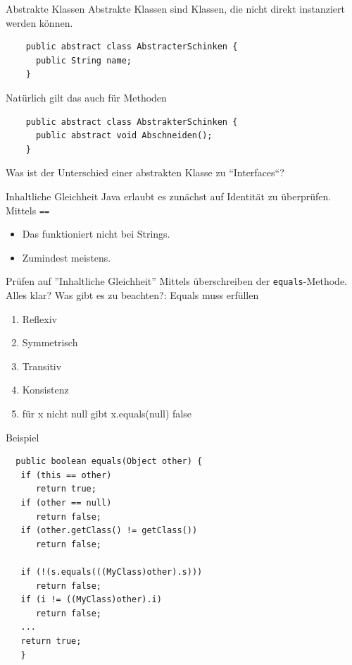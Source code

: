 \documentclass[18pt]{beamer}
\begin{document}
\begin{frame}[fragile]{Abstrakte Klassen}
 Abstrakte Klassen sind Klassen, die nicht direkt instanziert werden können.
 \begin{lstlisting}
    public abstract class AbstracterSchinken {
      public String name;
    }
 \end{lstlisting} \pause
 Natürlich gilt das auch für Methoden
 \begin{lstlisting}
    public abstract class AbstrakterSchinken {
      public abstract void Abschneiden();
    }
 \end{lstlisting} \pause
Was ist der Unterschied einer abstrakten Klasse zu ``Interfaces``?
\end{frame}

\begin{frame}[fragile]{Inhaltliche Gleichheit}
 Java erlaubt es zunächst auf Identität zu überprüfen.
 Mittels \verb|==|
 \begin{itemize}
  \item Das funktioniert nicht bei Strings.
  \item Zumindest meistens.
 \end{itemize}
\end{frame}
\begin{frame}[fragile]{Prüfen auf ''Inhaltliche Gleichheit''}
 Mittels überschreiben der \verb|equals|-Methode. Alles klar? \pause
 Was gibt es zu beachten?:
 Equals muss erfüllen
 \begin{enumerate}
  \item Reflexiv
  \item Symmetrisch
  \item Transitiv
  \item Konsistenz
  \item für x nicht null gibt x.equals(null) false
 \end{enumerate}
\end{frame}

\begin{frame}[fragile]{Beispiel}
 \begin{lstlisting}
  public boolean equals(Object other) {
   if (this == other)
      return true;
   if (other == null)
      return false;
   if (other.getClass() != getClass())
      return false;

   if (!(s.equals(((MyClass)other).s)))
      return false;
   if (i != ((MyClass)other).i)
      return false;
   ...
   return true;
   } 
 \end{lstlisting}
\end{frame}
\end{document}
